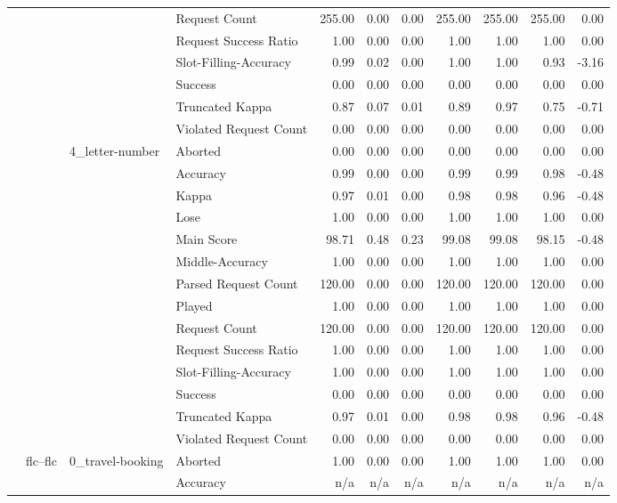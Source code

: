 \begin{tabular}{llllrrrrrrr}
 &  &  & Request Count & 255.00 & 0.00 & 0.00 & 255.00 & 255.00 & 255.00 & 0.00 \\
 &  &  & Request Success Ratio & 1.00 & 0.00 & 0.00 & 1.00 & 1.00 & 1.00 & 0.00 \\
 &  &  & Slot-Filling-Accuracy & 0.99 & 0.02 & 0.00 & 1.00 & 1.00 & 0.93 & -3.16 \\
 &  &  & Success & 0.00 & 0.00 & 0.00 & 0.00 & 0.00 & 0.00 & 0.00 \\
 &  &  & Truncated Kappa & 0.87 & 0.07 & 0.01 & 0.89 & 0.97 & 0.75 & -0.71 \\
 &  &  & Violated Request Count & 0.00 & 0.00 & 0.00 & 0.00 & 0.00 & 0.00 & 0.00 \\
\cline{3-11}
 &  & \multirow[t]{14}{*}{4_letter-number} & Aborted & 0.00 & 0.00 & 0.00 & 0.00 & 0.00 & 0.00 & 0.00 \\
 &  &  & Accuracy & 0.99 & 0.00 & 0.00 & 0.99 & 0.99 & 0.98 & -0.48 \\
 &  &  & Kappa & 0.97 & 0.01 & 0.00 & 0.98 & 0.98 & 0.96 & -0.48 \\
 &  &  & Lose & 1.00 & 0.00 & 0.00 & 1.00 & 1.00 & 1.00 & 0.00 \\
 &  &  & Main Score & 98.71 & 0.48 & 0.23 & 99.08 & 99.08 & 98.15 & -0.48 \\
 &  &  & Middle-Accuracy & 1.00 & 0.00 & 0.00 & 1.00 & 1.00 & 1.00 & 0.00 \\
 &  &  & Parsed Request Count & 120.00 & 0.00 & 0.00 & 120.00 & 120.00 & 120.00 & 0.00 \\
 &  &  & Played & 1.00 & 0.00 & 0.00 & 1.00 & 1.00 & 1.00 & 0.00 \\
 &  &  & Request Count & 120.00 & 0.00 & 0.00 & 120.00 & 120.00 & 120.00 & 0.00 \\
 &  &  & Request Success Ratio & 1.00 & 0.00 & 0.00 & 1.00 & 1.00 & 1.00 & 0.00 \\
 &  &  & Slot-Filling-Accuracy & 1.00 & 0.00 & 0.00 & 1.00 & 1.00 & 1.00 & 0.00 \\
 &  &  & Success & 0.00 & 0.00 & 0.00 & 0.00 & 0.00 & 0.00 & 0.00 \\
 &  &  & Truncated Kappa & 0.97 & 0.01 & 0.00 & 0.98 & 0.98 & 0.96 & -0.48 \\
 &  &  & Violated Request Count & 0.00 & 0.00 & 0.00 & 0.00 & 0.00 & 0.00 & 0.00 \\
\cline{2-11} \cline{3-11}
 & \multirow[t]{65}{*}{flc--flc} & \multirow[t]{13}{*}{0_travel-booking} & Aborted & 1.00 & 0.00 & 0.00 & 1.00 & 1.00 & 1.00 & 0.00 \\
 &  &  & Accuracy & n/a & n/a & n/a & n/a & n/a & n/a & n/a \\

\end{tabular}

